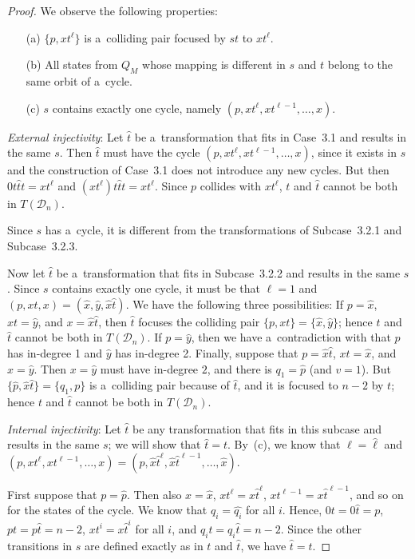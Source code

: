\documentclass{amsart}
\newcommand{\e}[1]{\hat{#1}}
\newcommand{\cD}{{\mathcal D}}
\begin{document}
\begin{proof}
We observe the following properties:
\begin{enumerate}
\item[(a)] $\{p,xt^\ell\}$ is a~colliding pair focused by $st$ to $xt^\ell$.

\item[(b)] All states from $Q_M$ whose mapping is different in $s$ and $t$ belong to the same orbit of a~cycle.

\item[(c)] $s$ contains exactly one cycle, namely $(p,xt^\ell,xt^{\ell-1},\ldots,x)$. 
\end{enumerate}

\textit{External injectivity}:
Let $\e{t}$ be a~transformation that fits in Case~3.1 and results in the same $s$.
Then $\e{t}$ must have the cycle $(p,xt^\ell,xt^{\ell-1},\ldots,x)$, since it exists in $s$ and the construction of Case~3.1 does not introduce any new cycles.
But then $0t\e{t}t = xt^{\ell}$ and $(xt^{\ell})t\e{t}t = xt^{\ell}$. Since $p$ collides with $xt^{\ell}$, $t$ and $\e{t}$ cannot be both in $T(\cD_n)$.

Since $s$ has a~cycle, it is different from the transformations of Subcase~3.2.1 and Subcase~3.2.3.

Now let $\e{t}$ be a~transformation that fits in Subcase~3.2.2 and results in the same $s$.
Since $s$ contains exactly one cycle, it must be that $\ell=1$ and $(p,xt,x) = (\e{x},\e{y},\e{x}\e{t})$.
We have the following three possibilities:
If $p = \e{x}$, $xt = \e{y}$, and $x = \e{x}\e{t}$, then $\e{t}$ focuses the colliding pair $\{p,xt\} = \{\e{x},\e{y}\}$; hence $t$ and $\e{t}$ cannot be both in $T(\cD_n)$.
If $p = \e{y}$, then we have a~contradiction with that $p$ has in-degree 1 and $\e{y}$ has in-degree 2.
Finally, suppose that $p = \e{x}\e{t}$, $xt = \e{x}$, and $x = \e{y}$.
Then $x = \e{y}$ must have in-degree $2$, and there is $q_1 = \e{p}$ (and $v = 1$).
But $\{\e{p},\e{x}\e{t}\} = \{q_1,p\}$ is a~colliding pair because of $\e{t}$, and it is focused to $n-2$ by $t$; hence $t$ and $\e{t}$ cannot be both in $T(\cD_n)$.

\textit{Internal injectivity}:
Let $\e{t}$ be any transformation that fits in this subcase and results in the same $s$; we will show that $\e{t}=t$.
By~(c), we know that $\ell = \e{\ell}$ and $(p,xt^\ell,xt^{\ell-1},\ldots,x) = (\e{p},\e{x}\e{t}^{\ell},\e{x}\e{t}^{\ell-1},\ldots,\e{x})$.

First suppose that $p = \e{p}$.
Then also $x = \e{x}$, $xt^\ell = x\e{t}^{\ell}$, $xt^{\ell-1} = x\e{t}^{\ell-1}$, and so on for the states of the cycle.
We know that $q_i = \e{q_i}$ for all $i$.
Hence, $0t = 0\e{t} = p$, $pt = p\e{t} = n-2$, $xt^i = x\e{t}^i$ for all $i$, and $q_i t = q_i\e{t} = n-2$.
Since the other transitions in $s$ are defined exactly as in $t$ and $\e{t}$, we have $\e{t}=t$.


\end{proof}
\end{document}
